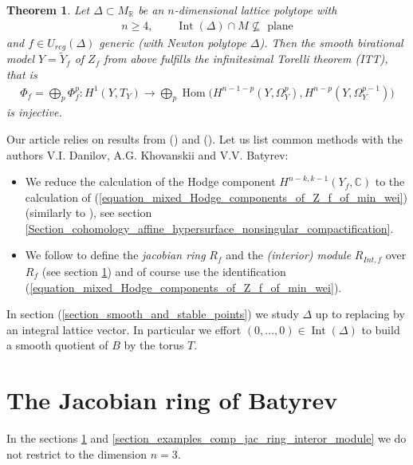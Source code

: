\documentclass[12pt, english]{article}
\newtheorem{theorem}[definition]{Theorem}
\DeclareMathOperator{\Hom}{Hom}
\DeclareMathOperator{\Int}{Int}
\begin{document}
\begin{theorem}
	Let $\Delta \subset M_{\mathbb{R}}$ be an $n$-dimensional lattice polytope with
	\begin{align*}
		n \geq 4, \quad \quad \Int(\Delta) \cap M \nsubseteq \textrm{ plane}
	\end{align*}
	and $f \in U_{reg}(\Delta)$ generic (with Newton polytope $\Delta$). Then the smooth birational model $Y = \tilde{Y}_f$ of $Z_f$ from above fulfills the infinitesimal Torelli theorem (ITT), that is
	\begin{align*}
		\Phi_f = \bigoplus_p \Phi_f^p: H^1(Y,T_Y) \rightarrow \bigoplus_{p} \Hom \Big( H^{n-1-p}(Y, \Omega_Y^p), H^{n-p}(Y, \Omega_Y^{p-1}) \Big)
	\end{align*}
	is injective. 
\end{theorem}

Our article relies on results from (\cite{DK86}) and (\cite{Bat93}). Let us list common methods with the authors V.I. Danilov, A.G. Khovanskii and V.V. Batyrev:
\begin{itemize}
	\item We reduce the calculation of the Hodge component $H^{n-k,k-1}(Y_f, \mathbb{C})$ to the calculation of (\ref{equation_mixed_Hodge_components_of_Z_f_of_min_wei}) (similarly to \cite{DK86}), see section \ref{Section_cohomology_affine_hypersurface_nonsingular_compactification}.
	\item We follow \cite{Bat93} to define the \textit{jacobian ring} $R_f$ and the \textit{(interior) module} $R_{Int,f}$ over $R_f$ (see section \ref{section_constr_jac_ring}) and of course use the identification (\ref{equation_mixed_Hodge_components_of_Z_f_of_min_wei}).
\end{itemize}

In section (\ref{section_smooth_and_stable_points}) we study $\Delta$ up to replacing by an integral lattice vector. In particular we effort $(0,...,0) \in \Int(\Delta)$  to build a smooth quotient of $B$ by the torus $T$.

\section{The Jacobian ring of Batyrev} \label{section_constr_jac_ring}

In the sections \ref{section_constr_jac_ring} and \ref{section_examples_comp_jac_ring_interor_module} we do not restrict to the dimension $n=3$.
\end{document}
